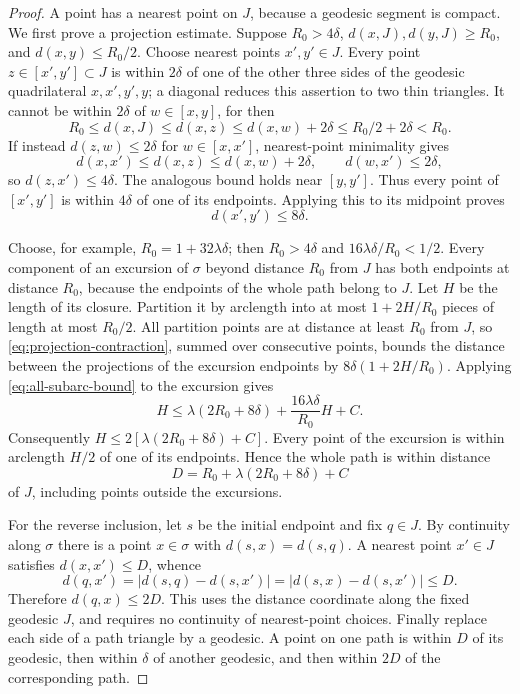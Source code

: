 \begin{proof}
A point has a nearest point on $J$, because a geodesic segment is compact.
We first prove a projection estimate. Suppose $R_0>4\delta$,
$d(x,J),d(y,J)\ge R_0$, and $d(x,y)\le R_0/2$. Choose nearest points
$x',y'\in J$. Every point $z\in[x',y']\subset J$ is within $2\delta$
of one of the other three sides of the geodesic quadrilateral
$x,x',y',y$; a diagonal reduces this assertion to two thin triangles.
It cannot be within $2\delta$ of $w\in[x,y]$, for then
\[
 R_0\le d(x,J)\le d(x,z)
 \le d(x,w)+2\delta\le R_0/2+2\delta<R_0.
\]
If instead $d(z,w)\le2\delta$ for $w\in[x,x']$, nearest-point
minimality gives
\[
 d(x,x')\le d(x,z)\le d(x,w)+2\delta,
 \qquad d(w,x')\le2\delta,
\]
so $d(z,x')\le4\delta$. The analogous bound holds near $[y,y']$.
Thus every point of $[x',y']$ is within $4\delta$ of one of its
endpoints. Applying this to its midpoint proves
\begin{equation}
 d(x',y')\le8\delta.
 \label{eq:projection-contraction}
\end{equation}

Choose, for example, $R_0=1+32\lambda\delta$; then $R_0>4\delta$ and
$16\lambda\delta/R_0<1/2$. Every component of an excursion of $\sigma$
beyond distance $R_0$ from $J$ has both endpoints at distance $R_0$,
because the endpoints of the whole path belong to $J$. Let $H$ be the
length of its closure. Partition it by arclength into at most
$1+2H/R_0$ pieces of length at most $R_0/2$.
All partition points are at distance at least $R_0$ from $J$, so
\eqref{eq:projection-contraction}, summed over consecutive points,
bounds the distance between the projections of the excursion endpoints
by $8\delta(1+2H/R_0)$. Applying
\eqref{eq:all-subarc-bound} to the excursion gives
\begin{equation}
 H\le\lambda(2R_0+8\delta)
       +\frac{16\lambda\delta}{R_0}H+C.
 \label{eq:excursion-bound}
\end{equation}
Consequently $H\le2[\lambda(2R_0+8\delta)+C]$. Every point of the
excursion is within arclength $H/2$ of one of its endpoints. Hence the
whole path is within distance
\[
 D=R_0+\lambda(2R_0+8\delta)+C
\]
of $J$, including points outside the excursions.

For the reverse inclusion, let $s$ be the initial endpoint and fix
$q\in J$. By continuity along $\sigma$ there is a point $x\in\sigma$
with $d(s,x)=d(s,q)$. A nearest point $x'\in J$ satisfies
$d(x,x')\le D$, whence
\[
 d(q,x')=\bigl|d(s,q)-d(s,x')\bigr|
         =\bigl|d(s,x)-d(s,x')\bigr|\le D.
\]
Therefore $d(q,x)\le2D$. This uses the distance coordinate along the
fixed geodesic $J$, and requires no continuity of nearest-point choices.
Finally replace each side of a path triangle by a geodesic. A point on
one path is within $D$ of its geodesic, then within $\delta$ of another
geodesic, and then within $2D$ of the corresponding path.
\end{proof}

